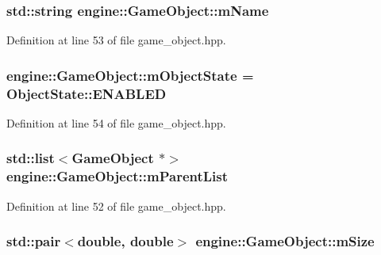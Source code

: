 \subsubsection[{\texorpdfstring{m\+Name}{mName}}]{\setlength{\rightskip}{0pt plus 5cm}std\+::string engine\+::\+Game\+Object\+::m\+Name}\hypertarget{classengine_1_1_game_object_af6c682b4912f897b9d798eb5479159bc}{}\label{classengine_1_1_game_object_af6c682b4912f897b9d798eb5479159bc}


Definition at line 53 of file game\+\_\+object.\+hpp.

\subsubsection[{\texorpdfstring{m\+Object\+State}{mObjectState}}]{ engine\+::\+Game\+Object\+::m\+Object\+State = Object\+State\+::\+E\+N\+A\+B\+L\+ED}\hypertarget{classengine_1_1_game_object_a14fc4192c3e64ff6c6421add7aeacad8}{}\label{classengine_1_1_game_object_a14fc4192c3e64ff6c6421add7aeacad8}


Definition at line 54 of file game\+\_\+object.\+hpp.

\subsubsection[{\texorpdfstring{m\+Parent\+List}{mParentList}}]{\setlength{\rightskip}{0pt plus 5cm}std\+::list$<${\bf Game\+Object} $\ast$$>$ engine\+::\+Game\+Object\+::m\+Parent\+List}\hypertarget{classengine_1_1_game_object_a407bc88cc30f6432b378da41ba142fae}{}\label{classengine_1_1_game_object_a407bc88cc30f6432b378da41ba142fae}


Definition at line 52 of file game\+\_\+object.\+hpp.

\subsubsection[{\texorpdfstring{m\+Size}{mSize}}]{\setlength{\rightskip}{0pt plus 5cm}std\+::pair$<$double, double$>$ engine\+::\+Game\+Object\+::m\+Size}\hypertarget{classengine_1_1_game_object_a52f18d63910240efdcd7490d81f37dc8}{}\label{classengine_1_1_game_object_a52f18d63910240efdcd7490d81f37dc8}


